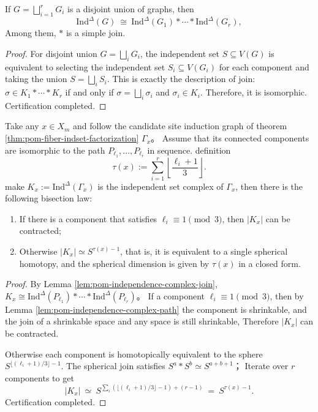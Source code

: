 \begin{lemma}\label{lem:pom-independence-complex-join}
If \(G=\bigsqcup_{i=1}^r G_i\) is a disjoint union of graphs, then
\[
\mathrm{Ind}^{\Delta}(G)\ \cong\ \mathrm{Ind}^{\Delta}(G_1)\ast\cdots\ast \mathrm{Ind}^{\Delta}(G_r),
\]
Among them, \(\ast\) is a simple join.
\end{lemma}
\begin{proof}
For disjoint union \(G=\bigsqcup_i G_i\), the independent set \(S\subseteq V(G)\) is equivalent to selecting the independent set \(S_i\subseteq V(G_i)\) for each component and taking the union \(S=\bigsqcup_i S_i\).
This is exactly the description of join: \(\sigma\in K_1\ast\cdots\ast K_r\) if and only if \(\sigma=\bigsqcup_i \sigma_i\) and \(\sigma_i\in K_i\).
Therefore, it is isomorphic. Certification completed.
\end{proof}

\begin{theorem}\label{thm:pom-fiber-independence-complex-classification}
Take any \(x\in X_m\) and follow the candidate site induction graph of theorem \ref{thm:pom-fiber-indset-factorization}
\(\Gamma_x\)。
Assume that its connected components are isomorphic to the path \(P_{\ell_1},\dots,P_{\ell_r}\) in sequence.
definition
\[
\tau(x):=\sum_{i=1}^r \left\lfloor\frac{\ell_i+1}{3}\right\rfloor.
\]
make
\(
K_x:=\mathrm{Ind}^{\Delta}(\Gamma_x)
\)
is the independent set complex of \(\Gamma_x\), then there is the following bisection law:
\begin{enumerate}
\item If there is a component that satisfies \(\ell_i\equiv 1\pmod 3\), then \(|K_x|\) can be contracted;
\item Otherwise \(|K_x|\simeq S^{\tau(x)-1}\), that is, it is equivalent to a single spherical homotopy, and the spherical dimension is given by \(\tau(x)\) in a closed form.
\end{enumerate}
\end{theorem}
\begin{proof}
By Lemma \ref{lem:pom-independence-complex-join},
\(
K_x\cong \mathrm{Ind}^{\Delta}(P_{\ell_1})\ast\cdots\ast \mathrm{Ind}^{\Delta}(P_{\ell_r})
\)。
If a component \(\ell_i\equiv 1\pmod 3\), then by Lemma \ref{lem:pom-independence-complex-path} the component is shrinkable, and the join of a shrinkable space and any space is still shrinkable,
Therefore \(|K_x|\) can be contracted.
\par
Otherwise each component is homotopically equivalent to the sphere \(S^{\lfloor(\ell_i+1)/3\rfloor-1}\).
The spherical join satisfies
\(
S^{a}\ast S^{b}\simeq S^{a+b+1}
\)；
Iterate over \(r\) components to get
\[
|K_x|\ \simeq\ S^{\sum_i(\lfloor(\ell_i+1)/3\rfloor-1)+(r-1)}
\ =\ S^{\tau(x)-1}.
\]
Certification completed.
\end{proof}

